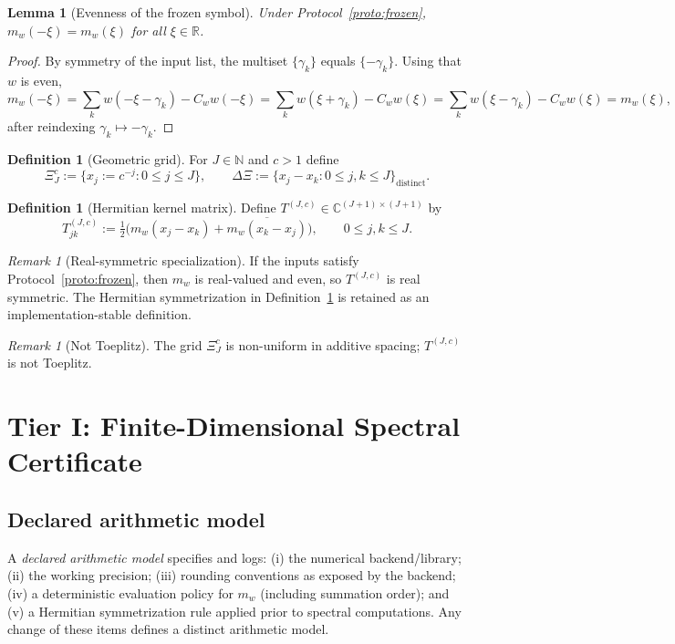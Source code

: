 \documentclass[12pt,reqno]{amsart}
\numberwithin{equation}{section}
\newtheorem{lemma}[theorem]{Lemma}
\theoremstyle{definition}
\newtheorem{definition}[theorem]{Definition}
\theoremstyle{remark}
\newtheorem{remark}[theorem]{Remark}
\newcommand{\RR}{\mathbb{R}}
\newcommand{\CC}{\mathbb{C}}
\newcommand{\NN}{\mathbb{N}}
\begin{document}
\begin{lemma}[Evenness of the frozen symbol]
\label{lem:mw_even}
Under Protocol~\ref{proto:frozen}, $m_w(-\xi)=m_w(\xi)$ for all $\xi\in\RR$.
\end{lemma}

\begin{proof}
By symmetry of the input list, the multiset $\{\gamma_k\}$ equals $\{-\gamma_k\}$.
Using that $w$ is even,
\[
m_w(-\xi)=\sum_k w(-\xi-\gamma_k)-C_w w(-\xi)
=\sum_k w(\xi+\gamma_k)-C_w w(\xi)
=\sum_k w(\xi-\gamma_k)-C_w w(\xi)=m_w(\xi),
\]
after reindexing $\gamma_k\mapsto -\gamma_k$.
\end{proof}

\begin{definition}[Geometric grid]
\label{def:grid}
For $J\in\NN$ and $c>1$ define
\[
\Xi_J^c := \{x_j := c^{-j} : 0\le j\le J\},
\qquad
\Delta\Xi := \{x_j-x_k : 0\le j,k\le J\}_{\mathrm{distinct}}.
\]
\end{definition}

\begin{definition}[Hermitian kernel matrix]
\label{def:kernel}
Define $T^{(J,c)}\in\CC^{(J+1)\times(J+1)}$ by
\[
T^{(J,c)}_{jk}
:= \tfrac12\bigl(m_w(x_j-x_k)+\overline{m_w(x_k-x_j)}\bigr),
\qquad 0\le j,k\le J.
\]
\end{definition}

\begin{remark}[Real-symmetric specialization]
If the inputs satisfy Protocol~\ref{proto:frozen}, then $m_w$ is real-valued and even,
so $T^{(J,c)}$ is real symmetric. The Hermitian symmetrization in
Definition~\ref{def:kernel} is retained as an implementation-stable definition.
\end{remark}

\begin{remark}[Not Toeplitz]
The grid $\Xi_J^c$ is non-uniform in additive spacing; $T^{(J,c)}$ is not Toeplitz.
\end{remark}

\section{Tier I: Finite-Dimensional Spectral Certificate}
\label{sec:tier1}

\subsection{Declared arithmetic model}
\label{subsec:arith}
A \emph{declared arithmetic model} specifies and logs:
(i) the numerical backend/library; (ii) the working precision;
(iii) rounding conventions as exposed by the backend; (iv) a deterministic evaluation
policy for $m_w$ (including summation order); and (v) a Hermitian symmetrization rule
applied prior to spectral computations. Any change of these items defines a distinct
arithmetic model.
\end{document}

